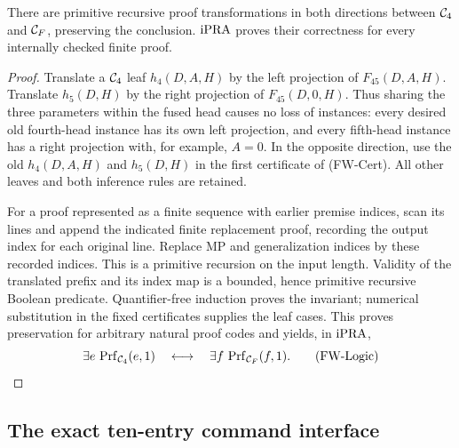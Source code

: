 \begin{fwlemma}
There are primitive recursive proof transformations in both directions
between $\mathcal C_4$ and $\mathcal C_F$, preserving the conclusion.  $\mathrm{iPRA}$
proves their correctness for every internally checked finite proof.
\end{fwlemma}
\begin{proof}
Translate a $\mathcal C_4$ leaf $h_4(D,A,H)$ by the left projection of
$F_{45}(D,A,H)$.  Translate $h_5(D,H)$ by the right projection of
$F_{45}(D,0,H)$.  Thus sharing the three parameters within the fused
head causes no loss of instances: every desired old fourth-head instance
has its own left projection, and every fifth-head instance has a right
projection with, for example, $A=0$.  In the opposite direction, use
the old $h_4(D,A,H)$ and $h_5(D,H)$ in the first certificate of
(FW-Cert).  All other leaves and both inference rules are retained.

For a proof represented as a finite sequence with earlier premise
indices, scan its lines and append the indicated finite replacement
proof, recording the output index for each original line.  Replace MP
and generalization indices by these recorded indices.  This is a
primitive recursion on the input length.  Validity of the translated
prefix and its index map is a bounded, hence primitive recursive Boolean
predicate.  Quantifier-free induction proves the invariant; numerical
substitution in the fixed certificates supplies the leaf cases.  This
proves preservation for arbitrary natural proof codes and yields, in
$\mathrm{iPRA}$,
\[
 \exists e\,\operatorname{Prf}_{\mathcal C_4}(e,1)
 \quad\longleftrightarrow\quad
 \exists f\,\operatorname{Prf}_{\mathcal C_F}(f,1).             \tag{FW-Logic}
\]
\end{proof}

\subsection{The exact ten-entry command interface}

